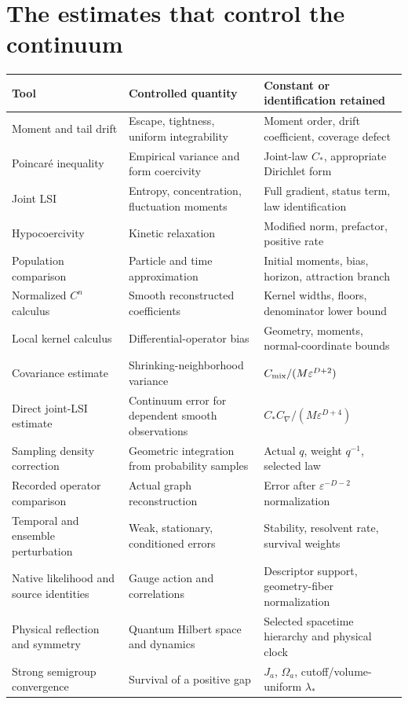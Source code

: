 \documentclass[11pt,a4paper]{article}
\begin{document}
\clearpage
\section{The estimates that control the continuum}
\small
\begin{longtable}{@{}>{\raggedright\arraybackslash}p{}>{\raggedright\arraybackslash}p{}>{\raggedright\arraybackslash}p{}@{}}
\toprule Tool & Controlled quantity & Constant or identification retained\\\midrule\endhead
Moment and tail drift & Escape, tightness, uniform integrability & Moment order, drift coefficient, coverage defect\\
Poincar\'e inequality & Empirical variance and form coercivity & Joint-law \(C_*\), appropriate Dirichlet form\\
Joint LSI & Entropy, concentration, fluctuation moments & Full gradient, status term, law identification\\
Hypocoercivity & Kinetic relaxation & Modified norm, prefactor, positive rate\\
Population comparison & Particle and time approximation & Initial moments, bias, horizon, attraction branch\\
Normalized \(C^n\) calculus & Smooth reconstructed coefficients & Kernel widths, floors, denominator lower bound\\
Local kernel calculus & Differential-operator bias & Geometry, moments, normal-coordinate bounds\\
Covariance estimate & Shrinking-neighborhood variance & \(C_{\rm mix}/(M\varepsilon^{D+2})\)\\
Direct joint-LSI estimate & Continuum error for dependent smooth observations & \(C_*C_\nabla/(M\varepsilon^{D+4})\)\\
Sampling density correction & Geometric integration from probability samples & Actual \(q\), weight \(q^{-1}\), selected law\\
Recorded operator comparison & Actual graph reconstruction & Error after \(\varepsilon^{-D-2}\) normalization\\
Temporal and ensemble perturbation & Weak, stationary, conditioned errors & Stability, resolvent rate, survival weights\\
Native likelihood and source identities & Gauge action and correlations & Descriptor support, geometry-fiber normalization\\
Physical reflection and symmetry & Quantum Hilbert space and dynamics & Selected spacetime hierarchy and physical clock\\
Strong semigroup convergence & Survival of a positive gap & \(J_a\), \(\Omega_a\), cutoff/volume-uniform \(\lambda_*\)\\
\bottomrule
\end{longtable}
\normalsize
\end{document}

